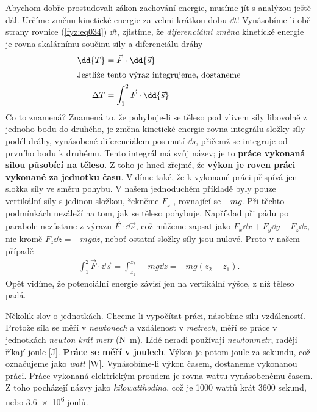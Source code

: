     Abychom dobře prostudovali zákon zachování energie, musíme jít s analýzou ještě dál. Určíme 
    změnu kinetické energie za velmi krátkou dobu \(\dd{t}\)! Vynásobíme-li obě strany rovnice 
    (\ref{fyz:eq034}) \(\dd{t}\), zjistíme, že \emph{diferenciální změna} kinetické energie je 
    rovna skalárnímu součinu síly a diferenciálu dráhy
    \begin{align}
      \dd{T}    &= \vec{F}\cdot\dd{\vec{s}}              \label{fyz:eq035} \\
      \shortintertext{Jestliže tento výraz integrujeme, dostaneme}
      \Delta T  &= \int_{1}^{2}\vec{F}\cdot\dd{\vec{s}}  \label{fyz:eq036}
    \end{align}
    Co to znamená? Znamená to, že pohybuje-li se těleso pod vlivem síly libovolně z jednoho bodu do 
    druhého, je změna kinetické energie rovna integrálu složky síly podél dráhy, vynásobené 
    diferenciálem posunutí \(\dd{s}\), přičemž se integruje od prvního bodu k druhému. Tento 
    integrál má svůj název; je to \textbf{práce vykonaná silou působící na těleso}. Z toho je hned 
    zřejmé, že \textbf{výkon je roven práci vykonané za jednotku času}. Vidíme také, že k vykonané 
    práci přispívá jen složka síly ve směru pohybu. V našem jednoduchém příkladě byly pouze 
    vertikální síly s jedinou složkou, řekněme \(F_z\) , rovnající se \(- mg\). Při těchto 
    podmínkách nezáleží na tom, jak se těleso pohybuje. Například při pádu po parabole nezůstane z 
    výrazu \(\vec{F}\cdot\dd{\vec{s}}\), což můžeme zapsat jako \(F_x\dd{x} + F_y\dd{y} + 
    F_z\dd{z}\), nic kromě \(F_z\dd{z}=-mg\dd{z}\), neboť ostatní složky síly jsou nulové. Proto v 
    našem případě
    \begin{align}
      \int_{1}^{2}\vec{F}\cdot\dd{\vec{s}} = 
      \int_{z_1}^{z_2}-mg\dd{z} = 
      -mg(z_2 - z_1). \label{fyz:eq037}
    \end{align}
    Opět vidíme, že potenciální energie závisí jen na vertikální výšce, z níž těleso padá.
    
    Několik slov o jednotkách. Chceme-li vypočítat práci, násobíme sílu vzdáleností. Protože síla 
    se měří v \emph{newtonech} a vzdálenost v \emph{metrech}, měří se práce v jednotkách 
    \emph{newton krát metr} (\si{\newton\meter}). Lidé neradi používají \emph{newtonmetr}, raději 
    říkají joule [\si{\joule}]. \textbf{Práce se měří v joulech}. Výkon je potom joule za sekundu, 
    což označujeme jako \emph{watt} [\si{\watt}]. Vynásobíme-li výkon časem, dostaneme vykonanou 
    práci. Práce vykonaná elektrickým proudem je rovna wattu vynásobenému časem. Z toho pocházejí 
    názvy jako \emph{kilowatthodina}, což je \num{1000} wattů krát \num{3600} sekund, nebo 
    \num{3.6e6} joulů.
    

